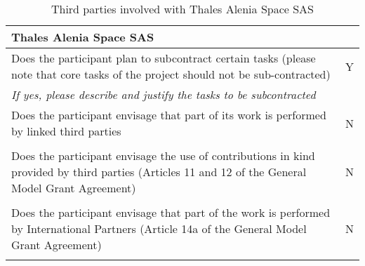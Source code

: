 \begin{table}[H]
	\centering
	\begin{tabular}{|p{10cm}|p{4cm}|}
		\hline
		
		\multicolumn{2}{|p{14cm}|}{\textbf{Thales Alenia Space SAS}}\\
		
		\hline
		
		Does the participant plan to subcontract certain tasks (please note that core tasks of the project should not be sub-contracted) & Y\\
		
		\hline
		
		\multicolumn{2}{|p{14cm}|}{\textit{If yes, please describe and justify the tasks to be subcontracted}}\\
		
		\hline
		
		Does the participant envisage that part of its work is performed by linked third parties & N\\
		
		\hline
		
		\multicolumn{2}{|p{14cm}|}{}\\
		
		\hline
		
		Does the participant envisage the use of contributions in kind provided by third parties (Articles 11 and 12 of the General Model Grant Agreement) & N\\
		
		\hline
		
		\multicolumn{2}{|p{14cm}|}{}\\
		
		\hline
		
		Does the participant envisage that part of the work is performed by International Partners (Article 14a of the General Model Grant Agreement) & N\\
		
		\hline
		
		\multicolumn{2}{|p{14cm}|}{}\\
		
		\hline
	\end{tabular}
	\caption{Third parties involved with Thales Alenia Space SAS}
\end{table}



